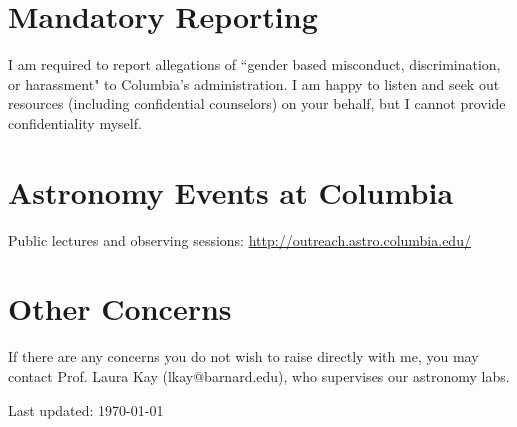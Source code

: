 \documentclass[10pt]{article}
\begin{document}
\section*{Mandatory Reporting}
I am required to report allegations of ``gender based misconduct, discrimination, or harassment" to
Columbia's administration. I am happy to listen and seek out resources (including confidential
counselors) on your behalf, but I cannot provide confidentiality myself.
 
\section*{Astronomy Events at Columbia}
Public lectures and observing sessions: \url{http://outreach.astro.columbia.edu/}

\section*{Other Concerns}
If there are any concerns you do not wish to raise directly with me, you may contact Prof. Laura Kay (lkay@barnard.edu), who supervises our astronomy labs.

\vspace*{\fill}
\centering\noindent Last updated: \today
\end{document}
